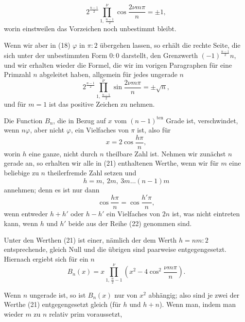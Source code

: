 \[
2^{\frac{n-1}{2}} \prod\limits_{1,\,\frac{n-1}{2}}^{\nu} \cos\frac{2\nu m\pi}{n} = \pm 1, \tag{19}
\]
worin einstweilen das Vorzeichen noch unbestimmt bleibt.

Wenn wir aber in (18) $\varphi$ in $\pi:2$ übergehen lassen, so erhält die rechte Seite, die sich unter der unbestimmten Form $0:0$ darstellt, den Grenzwerth $(-1)^{\frac{n-1}{2}} n$, und wir erhalten wieder die Formel, die wir im vorigen Paragraphen für eine Primzahl $n$ abgeleitet haben, allgemein für jedes ungerade $n$
\[
2^{\frac{n-1}{2}} \prod\limits_{1,\,\frac{n-1}{2}}^{\nu} \sin\frac{2\nu m\pi}{n} = \pm \sqrt{n}, \tag{20}
\]
und für $m=1$ ist das positive Zeichen zu nehmen.

Die Function $B_n$, die in Bezug auf $x$ vom $(n-1)^{\text{ten}}$ Grade ist, verschwindet, wenn $n\varphi$, aber nicht $\varphi$, ein Vielfaches von $\pi$ ist, also für
\[
x = 2\cos\frac{h\pi}{n}, \tag{21}
\]
worin $h$ eine ganze, nicht durch $n$ theilbare Zahl ist. Nehmen wir zunächst $n$ gerade an, so erhalten wir alle in (21) enthaltenen  Werthe, wenn wir für $m$ eine beliebige zu $n$ theilerfremde Zahl setzen und
\[
h = m,\ 2m,\ 3m \ldots (n-1)m \tag{22}
\]
annehmen; denn es ist nur dann
\[
\cos\frac{h\pi}{n} = \cos\frac{h'\pi}{n},
\]
wenn entweder $h+h'$ oder $h-h'$ ein Vielfaches von $2n$ ist, was nicht eintreten kann, wenn $h$ und $h'$ beide aus der Reihe (22) genommen sind.

Unter den Werthen (21) ist einer, nämlich der dem Werth $h = nm:2$ entsprechende, gleich Null und die übrigen sind paarweise entgegengesetzt. Hiernach ergiebt sich für ein  $n$
\[
B_n(x) = x \prod\limits_{1,\,\frac{n}{2}-1}^{\nu} \left(x^2 - 4\cos^2\frac{\nu m\pi}{n}\right). \tag{23}
\]

Wenn $n$ ungerade ist, so ist $B_n(x)$ nur von $x^2$ abhängig; also sind je zwei der Werthe (21) entgegengesetzt gleich (für $h$ und $h+n$). Wenn man, indem man wieder $m$ zu $n$ relativ prim voraussetzt,
